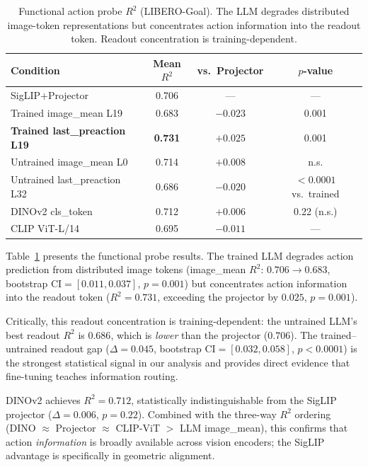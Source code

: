 \documentclass[letterpaper]{article}
\begin{document}
\begin{table}[t]
\centering
\caption{Functional action probe $R^2$ (LIBERO-Goal). The LLM degrades distributed image-token representations but concentrates action information into the readout token. Readout concentration is training-dependent.}
\label{tab:probe}
\begin{tabular}{lccc}
\toprule
\textbf{Condition} & \textbf{Mean $R^2$} & \textbf{vs.\ Projector} & \textbf{$p$-value} \\
\midrule
SigLIP+Projector           & 0.706 & ---      & --- \\
Trained image\_mean L19    & 0.683 & $-0.023$ & 0.001 \\
\textbf{Trained last\_preaction L19} & \textbf{0.731} & $+0.025$ & 0.001 \\
Untrained image\_mean L0   & 0.714 & $+0.008$ & n.s. \\
Untrained last\_preaction L32 & 0.686 & $-0.020$ & ${<}0.0001$ vs.\ trained \\
\midrule
DINOv2 cls\_token          & 0.712 & $+0.006$ & 0.22 (n.s.) \\
CLIP ViT-L/14              & 0.695 & $-0.011$ & --- \\
\bottomrule
\end{tabular}
\end{table}

Table~\ref{tab:probe} presents the functional probe results.
The trained LLM degrades action prediction from distributed image tokens (image\_mean $R^2$: $0.706 \to 0.683$, bootstrap CI$=[0.011, 0.037]$, $p{=}0.001$) but concentrates action information into the readout token ($R^2{=}0.731$, exceeding the projector by $0.025$, $p{=}0.001$).

Critically, this readout concentration is training-dependent: the untrained LLM's best readout $R^2$ is $0.686$, which is \emph{lower} than the projector ($0.706$).
The trained--untrained readout gap ($\Delta{=}0.045$, bootstrap CI$=[0.032, 0.058]$, $p{<}0.0001$) is the strongest statistical signal in our analysis and provides direct evidence that fine-tuning teaches information routing.

DINOv2 achieves $R^2{=}0.712$, statistically indistinguishable from the SigLIP projector ($\Delta{=}0.006$, $p{=}0.22$).
Combined with the three-way $R^2$ ordering (DINO $\approx$ Projector $\approx$ CLIP-ViT $>$ LLM image\_mean), this confirms that action \emph{information} is broadly available across vision encoders; the SigLIP advantage is specifically in geometric alignment.
\end{document}
